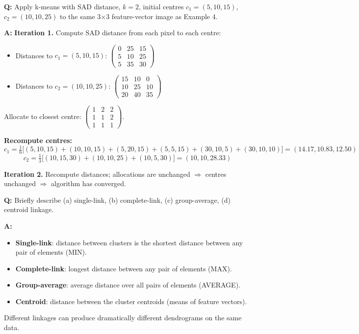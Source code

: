 \begin{exbox}
\textbf{Q:} Apply k-means with SAD distance, $k=2$, initial centres $c_1 = (5,10,15)$, $c_2 = (10,10,25)$ to the same 3$\times$3 feature-vector image as Example 4.

\textbf{A:} \textbf{Iteration 1.} Compute SAD distance from each pixel to each centre:
\begin{itemize}
  \item Distances to $c_1 = (5,10,15)$: $\begin{pmatrix} 0 & 25 & 15 \\ 5 & 10 & 25 \\ 5 & 35 & 30 \end{pmatrix}$
  \item Distances to $c_2 = (10,10,25)$: $\begin{pmatrix} 15 & 10 & 0 \\ 10 & 25 & 10 \\ 20 & 40 & 35 \end{pmatrix}$
\end{itemize}
Allocate to closest centre:
$\begin{pmatrix} 1 & 2 & 2 \\ 1 & 1 & 2 \\ 1 & 1 & 1 \end{pmatrix}$.

\textbf{Recompute centres:}
\[
c_1 = \tfrac{1}{6}\big[(5,10,15)+(10,10,15)+(5,20,15)+(5,5,15)+(30,10,5)+(30,10,10)\big] = (14.17, 10.83, 12.50)
\]
\[
c_2 = \tfrac{1}{3}\big[(10,15,30)+(10,10,25)+(10,5,30)\big] = (10, 10, 28.33)
\]

\textbf{Iteration 2.} Recompute distances; allocations are unchanged $\Rightarrow$ centres unchanged $\Rightarrow$ algorithm has converged.
\end{exbox}

\begin{exbox}
\textbf{Q:} Briefly describe (a) single-link, (b) complete-link, (c) group-average, (d) centroid linkage.

\textbf{A:}
\begin{itemize}
  \item \textbf{Single-link}: distance between clusters is the shortest distance between any pair of elements (MIN).
  \item \textbf{Complete-link}: longest distance between any pair of elements (MAX).
  \item \textbf{Group-average}: average distance over all pairs of elements (AVERAGE).
  \item \textbf{Centroid}: distance between the cluster centroids (means of feature vectors).
\end{itemize}
Different linkages can produce dramatically different dendrograms on the same data.
\end{exbox}

